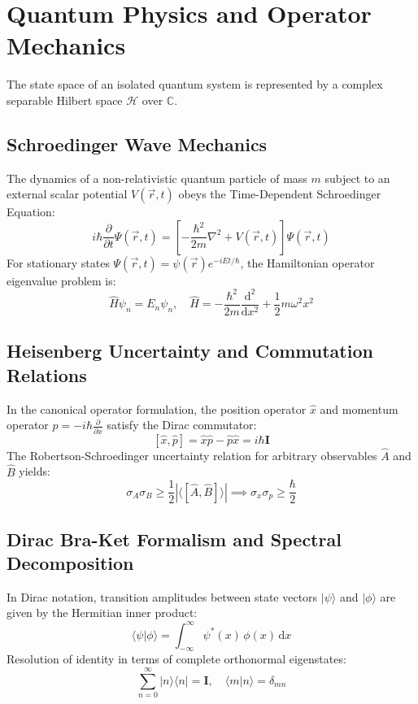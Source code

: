 \documentclass{article}
\begin{document}
\section{Quantum Physics and Operator Mechanics}

The state space of an isolated quantum system is represented by a complex separable Hilbert space $\mathcal{H}$ over $\mathbb{C}$.

\subsection{Schroedinger Wave Mechanics}
The dynamics of a non-relativistic quantum particle of mass $m$ subject to an external scalar potential $V(\vec{r}, t)$ obeys the Time-Dependent Schroedinger Equation:
\[
i \hbar \frac{\partial}{\partial t} \Psi(\vec{r}, t) = \left[ -\frac{\hbar^2}{2m} \nabla^2 + V(\vec{r}, t) \right] \Psi(\vec{r}, t)
\]
For stationary states $\Psi(\vec{r}, t) = \psi(\vec{r})e^{-iEt/\hbar}$, the Hamiltonian operator eigenvalue problem is:
\[
\hat{H} \psi_n = E_n \psi_n, \quad \hat{H} = -\frac{\hbar^2}{2m} \frac{\mathrm{d}^2}{\mathrm{d}x^2} + \frac{1}{2} m \omega^2 x^2
\]

\subsection{Heisenberg Uncertainty and Commutation Relations}
In the canonical operator formulation, the position operator $\hat{x}$ and momentum operator $\hat{p} = -i\hbar \frac{\partial}{\partial x}$ satisfy the Dirac commutator:
\[
[\hat{x}, \hat{p}] = \hat{x}\hat{p} - \hat{p}\hat{x} = i \hbar \mathbf{I}
\]
The Robertson-Schroedinger uncertainty relation for arbitrary observables $\hat{A}$ and $\hat{B}$ yields:
\[
\sigma_A \sigma_B \ge \frac{1}{2} \left| \langle [\hat{A}, \hat{B}] \rangle \right| \implies \sigma_x \sigma_p \ge \frac{\hbar}{2}
\]

\subsection{Dirac Bra-Ket Formalism and Spectral Decomposition}
In Dirac notation, transition amplitudes between state vectors $|\psi\rangle$ and $|\phi\rangle$ are given by the Hermitian inner product:
\[
\langle \psi | \phi \rangle = \int_{-\infty}^\infty \psi^*(x)\,\phi(x)\,\mathrm{d}x
\]
Resolution of identity in terms of complete orthonormal eigenstates:
\[
\sum_{n=0}^\infty |n\rangle \langle n| = \mathbf{I}, \quad \langle m | n \rangle = \delta_{mn}
\]
\end{document}
